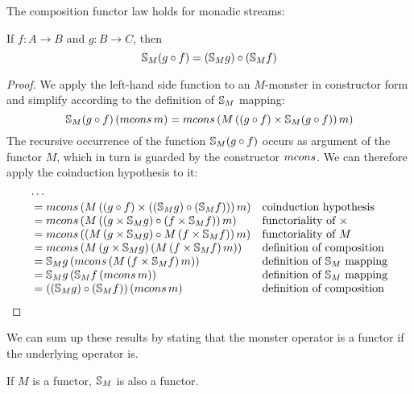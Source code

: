 \begin{lemma}\label{lemma:functor_comp}
The composition functor law holds for monadic streams:

If $f:A\rightarrow B$ and $g:B\rightarrow C$, then
$$
\mathbb{S}_{M} (g\circ f) = (\mathbb{S}_{M} g) \circ (\mathbb{S}_{M} f)
$$
\end{lemma}
\begin{proof}
We apply the left-hand side function to an $M$-monster in constructor form and simplify according to the definition of $\mathbb{S}_{M}$ mapping:
$$
\stream{M} (g\comp f)\,(\mcons\,m)
  = \mcons\,(M\,((g\comp f)\times \stream{M} (g\comp f))\,m)
$$
The recursive occurrence of the function $\mathbb{S}_{M} (g\circ f)$ occurs as argument of the functor $M$, which in turn is guarded by the constructor $\mcons$.
We can therefore apply the coinduction hypothesis to it:
$$
\begin{array}{l@{\quad}l}
\cdots\\
{}= \mcons\,(M\,((g\comp f)\times ((\stream{M} g) \comp (\stream{M} f)))\,m)
  & \mbox{coinduction hypothesis}\\ 
{}= \mcons\,(M\,((g\times \stream{M} g) \comp (f\times \stream{M} f))\,m)
  & \mbox{functoriality of }\times\\ 
{}= \mcons\,((M\,(g\times \stream{M} g) \comp M\,(f\times \stream{M} f))\,m)
  & \mbox{functoriality of }M\\ 
{}= \mcons\,(M\,(g\times \stream{M} g)\, (M\,(f\times \stream{M} f)\,m))
  & \mbox{definition of composition}\\ 
{}= \stream{M} g\, (\mcons\,(M\,(f\times \stream{M} f)\,m))
  & \mbox{definition of }\stream{M}\mbox{ mapping}\\ 
{}= \stream{M} g\, (\stream{M} f\,(\mcons\,m))
  & \mbox{definition of }\stream{M}\mbox{ mapping}\\ 
{}= ((\stream{M} g) \comp (\stream{M} f))\,(\mcons\,m)
  & \mbox{definition of composition}
\end{array}
$$
\end{proof}

We can sum up these results by stating that the monster operator is a functor if the underlying operator is.

\begin{theorem}
If $M$ is a functor, $\mathbb{S}_{M}$ is also a functor.
\end{theorem}
